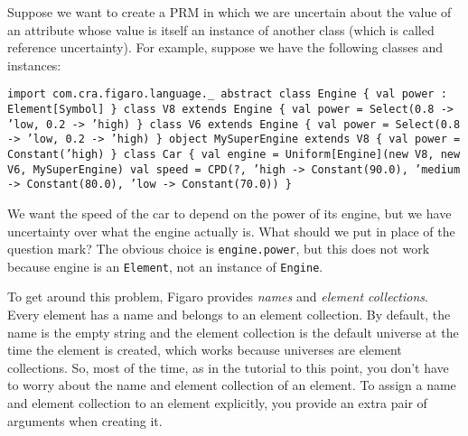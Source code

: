 Suppose we want to create a PRM in which we are uncertain about the value of an attribute whose value is itself an instance of another class (which is called reference uncertainty). For example, suppose we have the following classes and instances:

\begin{flushleft}
\texttt{import com.cra.figaro.language.\_
\newline 
\newline abstract class Engine \{ val power : Element[Symbol] \}
\newline class V8 extends Engine \{
\newline \tab val power = Select(0.8 -> 'low, 0.2 -> 'high) 
\newline \}
\newline class V6 extends Engine \{
\newline \tab val power = Select(0.8 -> 'low, 0.2 -> 'high)
\newline \}
\newline 
\newline object MySuperEngine extends V8 \{
\newline \tab val power = Constant('high)
\newline \}
\newline class Car \{
\newline \tab val engine = Uniform[Engine](new V8, new V6, MySuperEngine)
\newline \tab val speed = CPD(?,
\newline \tab 'high -> Constant(90.0),
\newline \tab 'medium -> Constant(80.0),
\newline \tab 'low -> Constant(70.0))
\newline \}
}
\end{flushleft}

We want the speed of the car to depend on the power of its engine, but we have uncertainty over what the engine actually is. What should we put in place of the question mark? The obvious choice is \texttt{engine.power}, but this does not work because engine is an \texttt{Element\-[Engine]}, not an instance of \texttt{Engine}.

To get around this problem, Figaro provides \emph{names} and \emph{element collections}. Every element has a name and belongs to an element collection. By default, the name is the empty string and the element collection is the default universe at the time the element is created, which works because universes are element collections. So, most of the time, as in the tutorial to this point, you don't have to worry about the name and element collection of an element. To assign a name and element collection to an element explicitly, you provide an extra pair of arguments when creating it.


